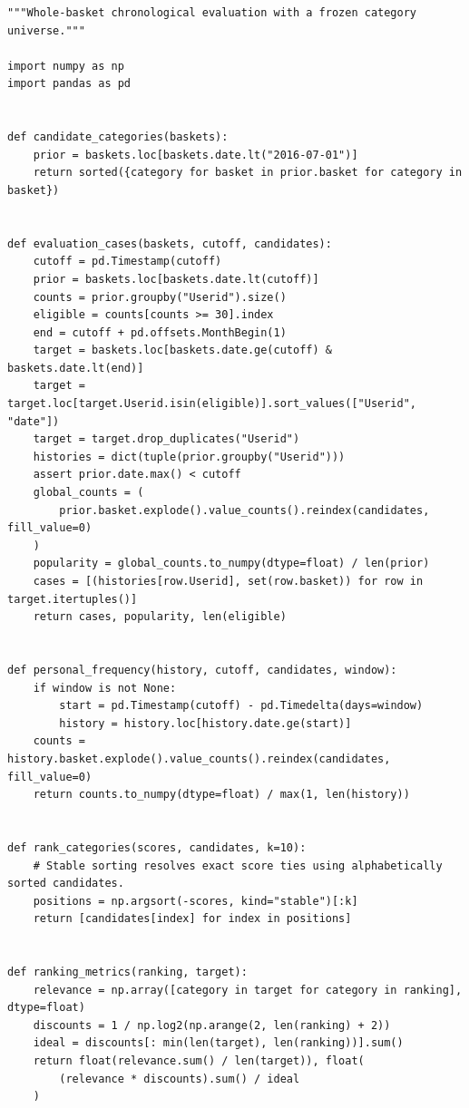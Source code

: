 \begin{Verbatim}[breaklines,breakanywhere,fontsize=\small]
"""Whole-basket chronological evaluation with a frozen category universe."""

import numpy as np
import pandas as pd


def candidate_categories(baskets):
    prior = baskets.loc[baskets.date.lt("2016-07-01")]
    return sorted({category for basket in prior.basket for category in basket})


def evaluation_cases(baskets, cutoff, candidates):
    cutoff = pd.Timestamp(cutoff)
    prior = baskets.loc[baskets.date.lt(cutoff)]
    counts = prior.groupby("Userid").size()
    eligible = counts[counts >= 30].index
    end = cutoff + pd.offsets.MonthBegin(1)
    target = baskets.loc[baskets.date.ge(cutoff) & baskets.date.lt(end)]
    target = target.loc[target.Userid.isin(eligible)].sort_values(["Userid", "date"])
    target = target.drop_duplicates("Userid")
    histories = dict(tuple(prior.groupby("Userid")))
    assert prior.date.max() < cutoff
    global_counts = (
        prior.basket.explode().value_counts().reindex(candidates, fill_value=0)
    )
    popularity = global_counts.to_numpy(dtype=float) / len(prior)
    cases = [(histories[row.Userid], set(row.basket)) for row in target.itertuples()]
    return cases, popularity, len(eligible)


def personal_frequency(history, cutoff, candidates, window):
    if window is not None:
        start = pd.Timestamp(cutoff) - pd.Timedelta(days=window)
        history = history.loc[history.date.ge(start)]
    counts = history.basket.explode().value_counts().reindex(candidates, fill_value=0)
    return counts.to_numpy(dtype=float) / max(1, len(history))


def rank_categories(scores, candidates, k=10):
    # Stable sorting resolves exact score ties using alphabetically sorted candidates.
    positions = np.argsort(-scores, kind="stable")[:k]
    return [candidates[index] for index in positions]


def ranking_metrics(ranking, target):
    relevance = np.array([category in target for category in ranking], dtype=float)
    discounts = 1 / np.log2(np.arange(2, len(ranking) + 2))
    ideal = discounts[: min(len(target), len(ranking))].sum()
    return float(relevance.sum() / len(target)), float(
        (relevance * discounts).sum() / ideal
    )



\end{Verbatim}
